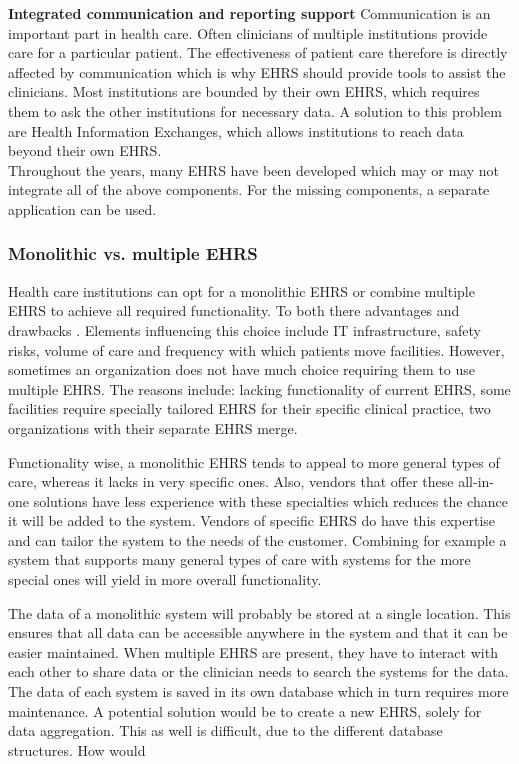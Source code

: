         \noindent\textbf{Integrated communication and reporting support} Communication is an important part in health care. Often clinicians of multiple institutions provide care for a particular patient. The effectiveness of patient care therefore is directly affected by communication which is why EHRS should provide tools to assist the clinicians. Most institutions are bounded by their own EHRS, which requires them to ask the other institutions for necessary data. A solution to this problem are Health Information Exchanges, which allows institutions to reach data beyond their own EHRS.\\
        
        \noindent Throughout the years, many EHRS have been developed which may or may not integrate all of the above components. For the missing components, a separate application can be used.

        \subsubsection{Monolithic vs. multiple EHRS}

        Health care institutions can opt for a monolithic EHRS or combine multiple EHRS to achieve all required functionality. To both there advantages and drawbacks \cite{multiple_ehrs}. Elements influencing this choice include IT infrastructure, safety risks, volume of care and frequency with which patients move facilities. However, sometimes an organization does not have much choice requiring them to use multiple EHRS. The reasons include: lacking functionality of current EHRS, some facilities require specially tailored EHRS for their specific clinical practice, two organizations with their separate EHRS merge.

        Functionality wise, a monolithic EHRS tends to appeal to more general types of care, whereas it lacks in very specific ones. Also, vendors that offer these all-in-one solutions have less experience with these specialties which reduces the chance it will be added to the system. Vendors of specific EHRS do have this expertise and can tailor the system to the needs of the customer. Combining for example a system that supports many general types of care with systems for the more special ones will yield in more overall functionality.

        The data of a monolithic system will probably be stored at a single location. This ensures that all data can be accessible anywhere in the system and that it can be easier maintained. When multiple EHRS are present, they have to interact with each other to share data or the clinician needs to search the systems for the data. The data of each system is saved in its own database which in turn requires more maintenance. A potential solution would be to create a new EHRS, solely for data aggregation. This as well is difficult, due to the different database structures. How would 



